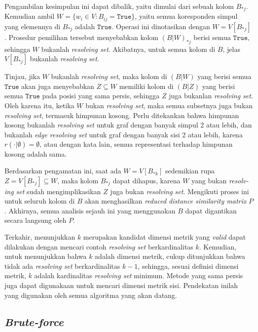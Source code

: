 \documentclass[10pt,twocolumn]{article}
\newcommand{\foreign}[1]{\foreignlanguage{english}{\textit{#1}}}
\def\True{\mathtt{True}}
\begin{document}
Pengambilan kesimpulan ini dapat dibalik, yaitu dimulai dari sebuah kolom \(B_{*j}\). Kemudian ambil \(W = \{w_i \in V : B_{ij} = \True\}\), yaitu semua koresponden simpul yang elemennya di \(B_{*j}\) adalah \(\True\). Operasi ini dinotasikan dengan \(W = V[B_{*j}]\). Prosedur pemilihan tersebut menyebabkan kolom \((B|W)_{*j}\) berisi semua \(\True\), sehingga \(W\) bukanlah \foreign{resolving set}. Akibatnya, untuk semua kolom di \(B\), jelas \(V[B_{*j}]\) bukanlah \foreign{resolving set}.

Tinjau, jika \(W\) bukanlah \foreign{resolving set}, maka kolom di \((B|W)\) yang berisi semua \(\True\) akan juga menyebabkan \(Z \subseteq W\) memiliki kolom di \((B|Z)\) yang berisi semua \(\True\) pada posisi yang sama persis, sehingga \(Z\) juga bukanlan \foreign{resolving set}. Oleh karena itu, ketika \(W\) bukan \foreign{resolving set}, maka semua subsetnya juga bukan \foreign{resolving set}, termasuk himpunan kosong. Perlu ditekankan bahwa himpunan kosong bukanlah \foreign{resolving set} untuk graf dengan banyak simpul 2 atau lebih, dan bukanlah \foreign{edge resolving set} untuk graf dengan banyak sisi 2 atau lebih, karena \(r(\cdot|\emptyset) = \emptyset\), atau dengan kata lain, semua representasi terhadap himpunan kosong adalah sama.

Berdasarkan pengamatan ini, saat ada \(W = V[B_{*k}]\) sedemikian rupa \(Z = V[B_{*j}] \subseteq W\), maka kolom \(B_{*j}\) dapat dihapus, karena \(W\) yang bukan \foreign{resolving set} sudah mengimplikasikan \(Z\) juga bukan \foreign{resolving set}. Mengikuti proses ini untuk seluruh kolom di \(B\) akan menghasilkan \foreign{reduced distance similarity matrix} \(P\). Akhirnya, semua analisis sejauh ini yang menggunakan \(B\) dapat digantikan secara langsung oleh \(P\).

Terkahir, menunjukkan \(k\) merupakan kandidat dimensi metrik yang \foreign{valid} dapat dilakukan dengan mencari contoh \foreign{resolving set} berkardinalitas \(k\). Kemudian, untuk menunjukkan bahwa \(k\) adalah dimensi metrik, cukup ditunjukkan bahwa tidak ada \foreign{resolving set} berkardinalitas \(k - 1\), sehingga, sesuai definisi dimensi metrik, \(k\) adalah kardinalitas \foreign{resolving set} minimum. Metode yang sama persis juga dapat digunakaan untuk mencari dimensi metrik sisi. Pendekatan inilah yang digunakan oleh semua algoritma yang akan datang.

\subsection{\foreign{Brute-force}}
\label{subsec:bf}
\end{document}
